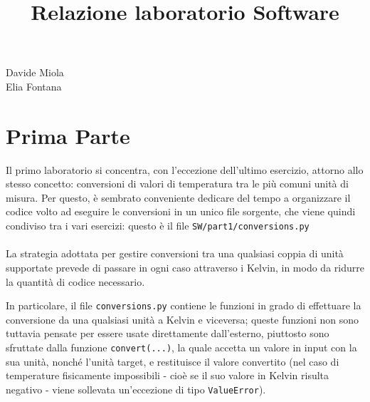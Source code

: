 \documentclass[12pt,a4paper]{article}
\begin{document}
\begin{figure}[b]
\centering

\end{figure}

\title{Relazione laboratorio Software}
\author{}
\maketitle
\vspace{10cm}
\begin{center}Davide Miola\\Elia Fontana\end{center}

\newpage
\setcounter{page}{1}
\rfoot{\thepage}
\section{Prima Parte}

Il primo laboratorio si concentra, con l'eccezione dell'ultimo esercizio, attorno allo stesso concetto: conversioni di valori di temperatura tra le più comuni unità di misura.
Per questo, è sembrato conveniente dedicare del tempo a organizzare il codice volto ad eseguire le conversioni in un unico file sorgente, che viene quindi condiviso tra i vari esercizi: questo è il file \verb|SW/part1/conversions.py|
\\ \\
La strategia adottata per gestire conversioni tra una qualsiasi coppia di unità supportate prevede di passare in ogni caso attraverso i Kelvin, in modo da ridurre la quantità di codice necessario.

In particolare, il file \verb|conversions.py| contiene le funzioni in grado di effettuare la conversione da una qualsiasi unità a Kelvin e viceversa; queste funzioni non sono tuttavia pensate per essere usate direttamente dall'esterno, piuttosto sono sfruttate dalla funzione \verb|convert(...)|, la quale accetta un valore in input con la sua unità, nonché l'unità target, e restituisce il valore convertito (nel caso di temperature fisicamente impossibili - cioè se il suo valore in Kelvin risulta negativo - viene sollevata un'eccezione di tipo \verb|ValueError|).
\end{document}
